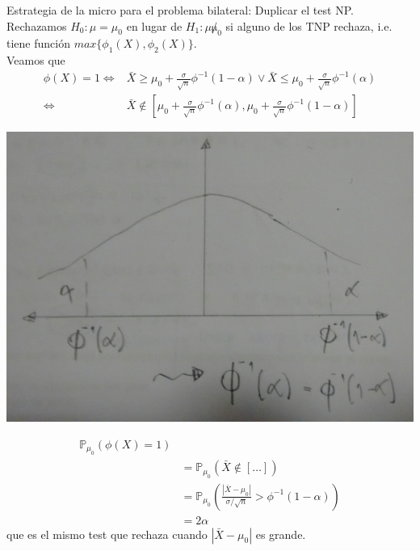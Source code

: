 \documentclass[10pt]{article}
\theoremstyle{plain}
\theoremstyle{definition}
\begin{document}
Estrategia de la micro para el problema bilateral: Duplicar el test NP.\\

Rechazamos $H_{0}:\mu=\mu_{0}$ en lugar de $H_{1}:\mu \not \mu_{0}$ si alguno de los TNP rechaza, i.e. tiene función $max\{\phi_{1}(X),\phi_{2}(X)\}$.\\

Veamos que
\begin{align*}
\phi(X) = 1 \Leftrightarrow & \bar{X} \ge \mu_{0} + \frac{\sigma}{\sqrt{n}}\phi^{-1}(1-\alpha) \lor \bar{X} \le \mu_{0} + \frac{\sigma}{\sqrt{n}}\phi^{-1}(\alpha)\\
\Leftrightarrow & \bar{X} \not \in [\mu_{0} + \frac{\sigma}{\sqrt{n}}\phi^{-1}(\alpha), \mu_{0} + \frac{\sigma}{\sqrt{n}}\phi^{-1}(1-\alpha)]
\end{align*}
\begin{center}
\includegraphics[scale=0.1]{imagenes/micro.jpg}
\end{center}
\begin{align*}
\mathbb{P}_{\mu_{0}}(\phi(X)=1)&\\
&= \mathbb{P}_{\mu_{0}}(\bar{X}\not \in [\ldots])\\
&= \mathbb{P}_{\mu_{0}}\left(\frac{|\bar{X}-\mu_{0}|}{\sigma/\sqrt{n}}>\phi^{-1}(1-\alpha)\right)\\
&= 2\alpha
\end{align*}
que es el mismo test que rechaza cuando $|\bar{X}-\mu_{0}|$ es grande.
\end{document}
